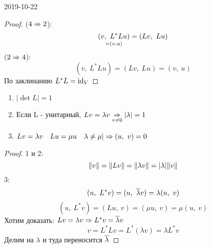 \documentclass[12pt, fleqn]{article}
\begin{document}
\begin{lect} {2019-10-22}
	\begin{proof}
		($4 \Rightarrow 2$):
		\[\underset{=(v,u)}{(v,\ L^*Lu)} = (Lv,\ Lu)\]
		($2 \Rightarrow 4$):
		\[(v,\ L^* L u) = (Lv,\ Lu) = (v,\ u) \]
		По заклинанию $L^*L = \mathop{\rm id}\nolimits_V$
	\end{proof}

	\begin{utv}
		\begin{enumerate}
			\item $|\det L| = 1$
			\item Если L - унитарный, $Lv = \lambda v \underset{v \neq 0}{\Rightarrow} |\lambda| = 1$
			\item $Lv = \lambda v \quad Lu = \mu u \quad \lambda \neq \mu | \Rightarrow (u,\ v) = 0$
		\end{enumerate}
	\end{utv}

	\begin{proof}
		1 и 2:
		\[\lVert v \rVert = \lVert Lv \rVert = \lVert \lambda v \rVert = |\lambda| \lVert v \rVert\]
		3:
		\[(u,\ L^* v) = (u,\ \ol{\lambda} v) = \lambda (u,\ v)\]
		\[(u,\ L^* v) = (Lu,\ v) = (\mu u,\ v) = \mu(u,\ v)\]
		Хотим доказать: $Lv = \lambda v \Rightarrow L^* v = \overline{\lambda} v$
		\[v = L^* L v = L^* (\lambda v) = \lambda L^* v\]
		Делим на $\lambda$ и туда переносится $\overline{\lambda}$

	\end{proof}
\end{lect}
\end{document}
